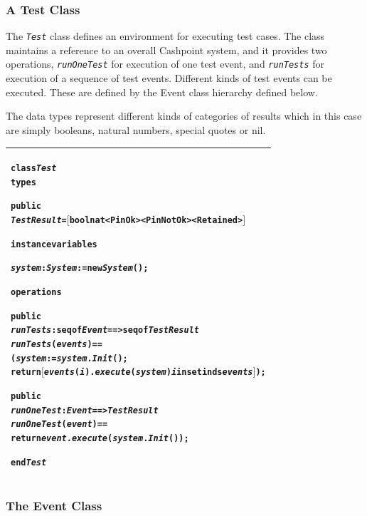 \documentclass[\pformat,12pt,twoside]{article}
\newenvironment{VDMgray}%
{\begin{tabular}{|G|}\hline\small\begin{alltt}}%
{\end{alltt}\normalsize\\
 \hline\end{tabular}}
\begin{document}
\subsubsection{A Test Class}

The \texttt{\emph{Test}} class defines an environment for executing test cases. 
The class maintains a reference to an overall Cashpoint system, 
and it provides two operations, \texttt{\emph{runOneTest}} for execution 
of one test event, and \texttt{\emph{runTests}} for execution of a sequence 
of test events. Different kinds of test events can be executed. 
These are defined by the Event class hierarchy defined below.

The data types represent different kinds of categories of results 
which in this case are simply booleans, natural numbers, special quotes or nil.

\begin{VDMgray}
\textbf{class} \textit{Test}
\textbf{types}

 \textbf{public}
 \textit{TestResult} = \ensuremath{[}\textbf{bool} {\textbar} \textbf{nat} {\textbar} \texttt{<}PinOk\texttt{>} {\textbar} \texttt{<}PinNotOk\texttt{>} {\textbar} \texttt{<}Retained\texttt{>}\ensuremath{]}

\textbf{instance} \textbf{variables}

 \textit{system} : \textit{System} := \textbf{new} \textit{System}();

\textbf{operations}

 \textbf{public}
 \textit{runTests} : \textbf{seq} \textbf{of} \textit{Event} ==\texttt{>} \textbf{seq} \textbf{of} \textit{TestResult}
 \textit{runTests} (\textit{events}) ==
   (\textit{system} := \textit{system}.\textit{Init}();
    \textbf{return} \ensuremath{[}\textit{events}(\textit{i}).\textit{execute}(\textit{system}) {\textbar} \textit{i} \textbf{in set} \textbf{inds} \textit{events} \ensuremath{]});

 \textbf{public}
 \textit{runOneTest} : \textit{Event} ==\texttt{>} \textit{TestResult}
 \textit{runOneTest} (\textit{event}) ==
    \textbf{return} \textit{event}.\textit{execute}(\textit{system}.\textit{Init}());

\textbf{end} \textit{Test}
\end{VDMgray}

\newpage
\subsubsection{The Event Class}
\end{document}
